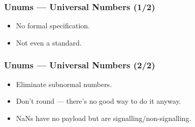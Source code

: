 \begin{frame}

\frametitle{Unums --- Universal Numbers (1/2)}

\begin{itemize}

\item No formal specification.

\item Not even a standard.

\end{itemize}

\end{frame}


\begin{frame}

\frametitle{Unums --- Universal Numbers (2/2)}

\begin{itemize}

\item Eliminate subnormal numbers.

\item Don't round --- there's no good way to do it anyway.

\item NaNs have no payload but are signalling/non-signalling.

\end{itemize}

\end{frame}
